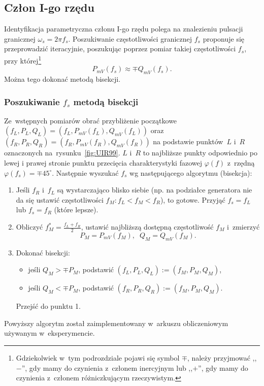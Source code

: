 \documentclass[paper=a4,DIV=12]{lpas}
\newcommand{\degree}{^{\circ}}
\begin{document}
\begin{appendices}
  \subsection{Człon I-go rzędu}
  \label{sec:4C7KI}

  Identyfikacja parametryczna członu I-go rzędu polega na znalezieniu pulsacji
  granicznej $\omega_s = 2 \pi f_s$. Poszukiwanie częstotliwości granicznej
  $f_s$ proponuje się przeprowadzić iteracyjnie, poszukując poprzez pomiar
  takiej częstotliwości $f_s$, przy której\footnote{Gdziekolwiek w~tym
  podrozdziale pojawi się symbol $\mp$, należy przyjmować ,,$-$'', gdy mamy do
  czynienia z~członem inercyjnym lub ,,$+$'', gdy mamy do czynienia z~członem
  różniczkującym rzeczywistym.}
  \begin{equation}
    P_{mV}(f_s) \approx \mp Q_{mV}(f_s).
    \label{eq:7M2JN}
  \end{equation}
  Można tego dokonać metodą bisekcji.

  \subsubsection{Poszukiwanie $f_s$ metodą bisekcji}
  \label{sec:L0JNW}

  Ze~wstępnych pomiarów obrać przybliżenie początkowe
  $(f_L, P_L, Q_L) = (f_L, P_{mV}(f_L), Q_{mV}(f_L))$
  oraz $(f_R, P_R, Q_R) = (f_R, P_{mV}(f_R), Q_{mV}(f_R))$
  na podstawie punktów~$L$ i~$R$ oznaczonych na~rysunku~\ref{fig:UIR99}. $L$ i~$R$
  to najbliższe punkty odpowiednio po lewej i prawej stronie punktu przecięcia
  charakterystyki fazowej $\varphi(f)$ z~rzędną $\varphi(f_s) = \mp 45\degree$.
  Następnie wyszukać $f_s$ wg następującego algorytmu (bisekcja):

  \begin{enumerate}
    \item Jeśli $f_R$ i~$f_L$ są wystarczająco blisko siebie (np. na podziałce
      generatora nie da się ustawić częstotliwości $f_M: f_L < f_M < f_R$), to
      gotowe. Przyjąć $f_s = f_L$ lub $f_s = f_R$ (które lepsze).
    \item Obliczyć $f_M^{*} = \frac{f_L + f_R}{2}$, ustawić najbliższą dostępną
      częstotliwość $f_M$ i~zmierzyć \[P_M = P_{mV}(f_M),\;\; Q_M = Q_{mV}(f_M).\]
    \item Dokonać bisekcji:
      \begin{itemize}
        \item jeśli $Q_M > \mp P_M$, podstawić $(f_L, P_L, Q_L) := (f_M, P_M, Q_M)$,
        \item jeśli $Q_M < \mp P_M$, podstawić $(f_R, P_R, Q_R) := (f_M, P_M, Q_M)$.
      \end{itemize}
      Przejść do punktu 1.
  \end{enumerate}
  Powyższy algorytm został zaimplementowany w~arkuszu obliczeniowym używanym
  w~eksperymencie.


\end{appendices}
\end{document}
